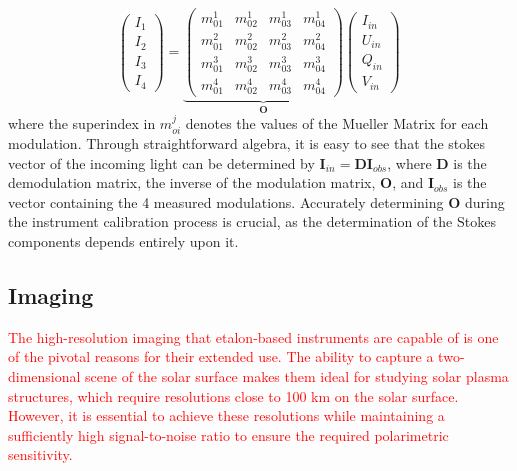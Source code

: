 \begin{equation}
  \begin{pmatrix}
  I _ 1 \\
  I _ 2 \\
  I _ 3 \\
  I _ 4
  \end{pmatrix} = 
  \underbrace{\begin{pmatrix} 
      m ^ 1 _ {01} & m ^ 1 _ {02} & m ^ 1 _ {03} & m ^ 1 _ {04} \\ 
      m ^ 2 _ {01} & m ^ 2 _ {02} & m ^ 2 _ {03} & m ^ 2 _ {04} \\
      m ^ 3 _ {01} & m ^ 3 _ {02} & m ^ 3 _ {03} & m ^ 3 _ {04} \\
      m ^ 4 _ {01} & m ^ 4 _ {02} & m ^ 4 _ {03} & m ^ 4 _ {04} 
  \end{pmatrix}}_ {\textbf{O}}
  \begin{pmatrix}
    I _ {in} \\
    U _ {in} \\
    Q _ {in} \\
    V _ {in}
    \end{pmatrix} \, 
    \label{eq_spectro_theory: stokes_linear_comb}
\end{equation}
where the superindex in $m ^j _{oi}$ denotes the values of the Mueller Matrix for each modulation. Through straightforward algebra, it is easy to see that the stokes vector of the incoming light can be determined by $\textbf{I}_{in} = \textbf{D}\textbf{I}_{obs}$, where $\textbf{D}$ is the demodulation matrix, the inverse of the modulation matrix, $\textbf{O}$, and $\textbf{I}_{obs}$ is the vector containing the 4 measured modulations. Accurately determining $\textbf{O}$ during the instrument calibration process is crucial, as the determination of the Stokes components depends entirely upon it.

\subsection{\label{susec_spectropolarimeters: Imaging}Imaging}

\textcolor{red}{The high-resolution imaging that etalon-based instruments are capable of is one of the pivotal reasons for their extended use. The ability to capture a two-dimensional scene of the solar surface makes them ideal for studying solar plasma structures, which require resolutions close to 100 km on the solar surface. However, it is essential to achieve these resolutions while maintaining a sufficiently high signal-to-noise ratio to ensure the required polarimetric sensitivity.}

